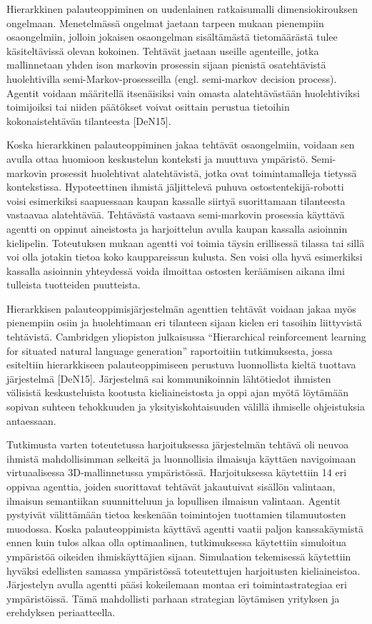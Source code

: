 \documentclass[finnish]{tktltiki2}
\theoremstyle{definition}
\theoremstyle{remark}
\begin{document}
Hierarkkinen palauteoppiminen on uudenlainen ratkaisumalli dimensiokirouksen ongelmaan. Menetelmässä ongelmat jaetaan tarpeen mukaan pienempiin osaongelmiin, jolloin jokaisen osaongelman sisältämästä tietomäärästä tulee käsiteltävissä olevan kokoinen. Tehtävät jaetaan useille agenteille, jotka mallinnetaan yhden ison markovin prosessin sijaan pienistä osatehtävistä huolehtivilla semi-Markov-prosesseilla (engl. semi-markov decision process). Agentit voidaan määritellä itsenäisiksi vain omasta alatehtävästään huolehtiviksi toimijoiksi tai niiden päätökset voivat osittain perustua tietoihin kokonaistehtävän tilanteesta [DeN15]. 
 
Koska hierarkkinen palauteoppiminen jakaa tehtävät osaongelmiin, voidaan sen avulla ottaa huomioon keskustelun konteksti ja muuttuva ympäristö. Semi-markovin prosessit huolehtivat alatehtävistä, jotka ovat toimintamalleja tietyssä kontekstissa. Hypoteettinen ihmistä jäljittelevä puhuva ostostentekijä-robotti voisi esimerkiksi saapuessaan kaupan kassalle siirtyä suorittamaan tilanteesta vastaavaa alatehtävää. Tehtävästä vastaava semi-markovin prosessia käyttävä agentti on oppinut aineistosta ja harjoittelun avulla kaupan kassalla asioinnin kielipelin. Toteutuksen mukaan agentti voi toimia täysin erillisessä tilassa tai sillä voi olla jotakin tietoa koko kauppareissun kulusta. Sen voisi olla hyvä esimerkiksi kassalla asioinnin yhteydessä voida ilmoittaa ostosten keräämisen aikana ilmi tulleista tuotteiden puutteista. 
 
Hierarkkisen palauteoppimisjärjestelmän agenttien tehtävät voidaan jakaa myös pienempiin osiin ja huolehtimaan eri tilanteen sijaan kielen eri tasoihin liittyvistä tehtävistä. Cambridgen yliopiston julkaisussa “Hierarchical reinforcement learning for situated natural language generation” raportoitiin tutkimuksesta, jossa esiteltiin hierarkkiseen palauteoppimiseen perustuva luonnollista kieltä tuottava järjestelmä [DeN15]. Järjestelmä sai kommunikoinnin lähtötiedot ihmisten välisistä keskusteluista kootusta kieliaineistosta ja oppi ajan myötä löytämään sopivan suhteen tehokkuuden ja yksityiskohtaisuuden välillä ihmiselle ohjeistuksia antaessaan.   
 
Tutkimusta varten toteutetussa harjoituksessa järjestelmän tehtävä oli neuvoa ihmistä mahdollisimman selkeitä ja luonnollisia ilmaisuja käyttäen navigoimaan virtuaalisessa 3D-mallinnetussa ympäristössä. Harjoituksessa käytettiin 14 eri oppivaa agenttia, joiden suorittavat tehtävät jakautuivat sisällön valintaan, ilmaisun semantiikan suunnitteluun ja lopullisen ilmaisun valintaan. Agentit pystyivät välittämään tietoa keskenään toimintojen tuottamien tilamuutosten muodossa. Koska palauteoppimista käyttävä agentti vaatii paljon kanssakäymistä ennen kuin tulos alkaa olla optimaalinen, tutkimuksessa käytettiin simuloitua ympäristöä oikeiden ihmiskäyttäjien sijaan. Simulaation tekemisessä käytettiin hyväksi edellisten samassa ympäristössä toteutettujen harjoitusten kieliaineistoa. Järjestelyn avulla agentti pääsi kokeilemaan montaa eri toimintastrategiaa eri ympäristöissä. Tämä mahdollisti parhaan strategian löytämisen yrityksen ja erehdyksen periaatteella. 
 
\end{document}

